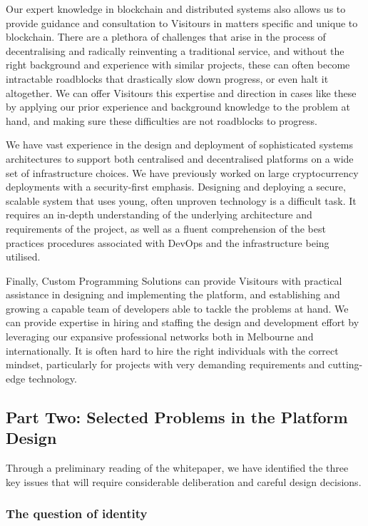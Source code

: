 \documentclass[fontsize=12pt,a4paper]{article}
\begin{document}
Our expert knowledge in blockchain and distributed systems also allows us to provide guidance and consultation to Visitours in matters specific and unique to blockchain. There are a plethora of challenges that arise in the process of decentralising and radically reinventing a traditional service, and without the right background and experience with similar projects, these can often become intractable roadblocks that drastically slow down progress, or even halt it altogether. We can offer Visitours this expertise and direction in cases like these by applying our prior experience and background knowledge to the problem at hand, and making sure these difficulties are not roadblocks to progress.

We have vast experience in the design and deployment of sophisticated systems architectures to support both centralised and decentralised platforms on a wide set of infrastructure choices. We have previously worked on large cryptocurrency deployments with a security-first emphasis. Designing and deploying a secure, scalable system that uses young, often unproven technology is a difficult task. It requires an in-depth understanding of the underlying architecture and requirements of the project, as well as a fluent comprehension of the best practices procedures associated with DevOps and the infrastructure being utilised.

Finally, Custom Programming Solutions can provide Visitours with practical assistance in designing and implementing the platform, and establishing and growing a capable team of developers able to tackle the problems at hand. We can provide expertise in hiring and staffing the design and development effort by leveraging our expansive professional networks both in Melbourne and internationally. It is often hard to hire the right individuals with the correct mindset, particularly for projects with very demanding requirements and cutting-edge technology.

\subsection*{Part Two: Selected Problems in the Platform Design}

Through a preliminary reading of the whitepaper, we have identified the three key issues that will require considerable deliberation and careful design decisions.

\subsubsection*{The question of identity}
\end{document}
